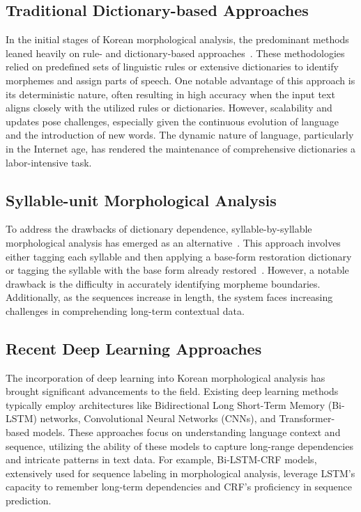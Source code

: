 \documentclass[AMS,STIX2COL]{WileyNJD-v2}
\begin{document}
    \subsection{Traditional Dictionary-based Approaches}\label{subsec:traditional-dictionary-based-approaches}
    In the initial stages of Korean morphological analysis, the predominant methods leaned heavily on rule- and dictionary-based approaches~\cite{KwonHC1991}.
    These methodologies relied on predefined sets of linguistic rules or extensive dictionaries to identify morphemes and assign parts of speech.
    One notable advantage of this approach is its deterministic nature, often resulting in high accuracy when the input text aligns closely with the utilized rules or dictionaries.
    However, scalability and updates pose challenges, especially given the continuous evolution of language and the introduction of new words.
    The dynamic nature of language, particularly in the Internet age, has rendered the maintenance of comprehensive dictionaries a labor-intensive task.

    \subsection{Syllable-unit Morphological Analysis}\label{subsec:syllable-unit-morphological-analysis}
    To address the drawbacks of dictionary dependence, syllable-by-syllable morphological analysis has emerged as an alternative~\cite{ShimKS2011, LeeCK2013, LeeCH2016, KimHM2016, Li2017, KimSW2018, ChoiYS2018, MinJW2019, KimHM2019, SongHJ2019, SongHJ2020, YounJY2021, ShinHJ2023}.
    This approach involves either tagging each syllable and then applying a base-form restoration dictionary~\cite{ShimKS2011, LeeCH2016} or tagging the syllable with the base form already restored~\cite{YounJY2021}.
    However, a notable drawback is the difficulty in accurately identifying morpheme boundaries.
    Additionally, as the sequences increase in length, the system faces increasing challenges in comprehending long-term contextual data.

    \subsection{Recent Deep Learning Approaches}\label{subsec:recent-deep-learning-approaches}
    The incorporation of deep learning into Korean morphological analysis has brought significant advancements to the field.
    Existing deep learning methods typically employ architectures like Bidirectional Long Short-Term Memory (Bi-LSTM) networks, Convolutional Neural Networks (CNNs), and Transformer-based models.
    These approaches focus on understanding language context and sequence, utilizing the ability of these models to capture long-range dependencies and intricate patterns in text data.
    For example, Bi-LSTM-CRF models, extensively used for sequence labeling in morphological analysis, leverage LSTM's capacity to remember long-term dependencies and CRF's proficiency in sequence prediction.
\end{document}

